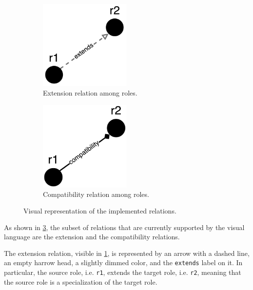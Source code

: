 \begin{figure}[H]
    \begin{subfigure}[h]{0.5\linewidth}
        \centering
        \includegraphics[width=0.5\textwidth]{images/visual-language/extension.png}
        \caption{Extension relation among roles.}
        \label{fig:extension}
    \end{subfigure}
    \begin{subfigure}[h]{0.5\linewidth}
        \centering
        \includegraphics[width=0.5\textwidth]{images/visual-language/compatibility.png}
        \caption{Compatibility relation among roles.}
        \label{fig:compatibility}
    \end{subfigure}
    \caption{Visual representation of the implemented relations.}
    \label{fig:relations}
\end{figure}

As shown in \cref{fig:relations}, the subset of relations that are currently supported by the visual language are the extension and the compatibility relations.

The extension relation, visible in \cref{fig:extension}, is represented by an arrow with a dashed line, an empty harrow head, a slightly dimmed color, and the \texttt{extends} label on it.
In particular, the source role, i.e. \texttt{r1}, extends the target role, i.e. \texttt{r2}, meaning that the source role is a specialization of the target role.


